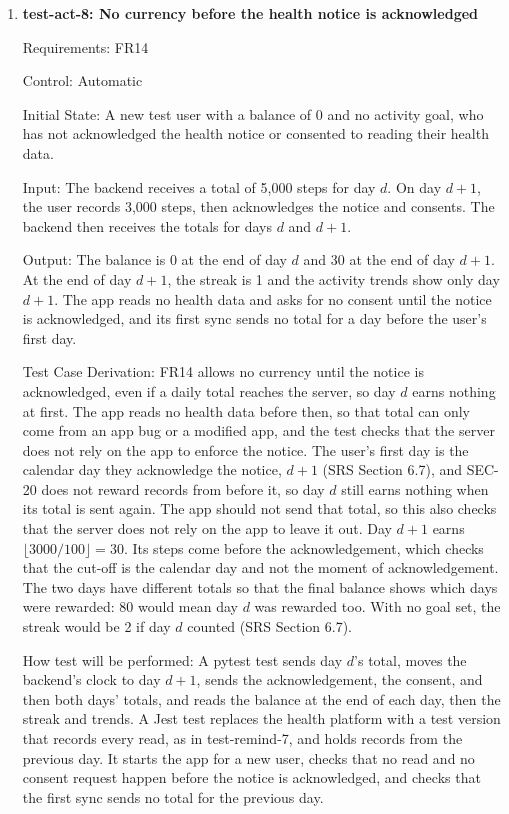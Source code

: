 \documentclass[12pt, titlepage]{article}
\begin{document}
\begin{enumerate}
\item{\textbf{test-act-8: No currency before the health notice is
acknowledged}\\}

Requirements: FR14

Control: Automatic

Initial State: A new test user with a balance of 0 and no activity goal, who
has not acknowledged the health notice or consented to \progname{} reading
their health data.

Input: The backend receives a total of 5,000 steps for day $d$. On day $d+1$,
the user records 3,000 steps, then acknowledges the notice and consents. The
backend then receives the totals for days $d$ and $d+1$.

Output: The balance is 0 at the end of day $d$ and 30 at the end of day $d+1$.
At the end of day $d+1$, the streak is 1 and the activity trends show only day
$d+1$. The app reads no health data and asks for no consent until the notice is
acknowledged, and its first sync sends no total for a day before the user's
first day.

Test Case Derivation: FR14 allows no currency until the notice is
acknowledged, even if a daily total reaches the server, so day $d$ earns
nothing at first. The app reads no health data before then, so that total can
only come from an app bug or a modified app, and the test checks that the
server does not rely on the app to enforce the notice. The user's first day is
the calendar day they acknowledge the notice, $d+1$ (SRS Section 6.7), and
SEC-20 does not reward records from before it, so day $d$ still earns nothing
when its total is sent again. The app should not send that total, so this also
checks that the server does not rely on the app to leave it out. Day $d+1$ earns
$\lfloor 3000 / 100 \rfloor = 30$. Its steps come before the acknowledgement,
which checks that the cut-off is the calendar day and not the moment of
acknowledgement. The two days have different totals so that the final balance
shows which days were rewarded: 80 would mean day $d$ was rewarded too. With no
goal set, the streak would be 2 if day $d$ counted (SRS Section 6.7).

How test will be performed: A pytest test sends day $d$'s total, moves the
backend's clock to day $d+1$, sends the acknowledgement, the consent, and then
both days' totals, and reads the balance at the end of each day, then the
streak and trends. A Jest test replaces the health platform with a test version
that records every read, as in test-remind-7, and holds records from the
previous day. It starts the app for a new user, checks that no read and no
consent request happen before the notice is acknowledged, and checks that the
first sync sends no total for the previous day.


\end{enumerate}
\end{document}
